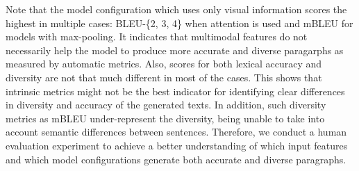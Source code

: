 \documentclass[11pt,a4paper]{article}
\begin{document}
Note that the model configuration which uses only visual information scores the highest in multiple cases: BLEU-\{2, 3, 4\} when attention is used and mBLEU for models with max-pooling.
It indicates that multimodal features do not necessarily help the model to produce more accurate and diverse paragarphs as measured by automatic metrics.
Also, scores for both lexical accuracy and diversity are not that much different in most of the cases.
This shows that intrinsic metrics might not be the best indicator for identifying clear differences in diversity and accuracy of the generated texts.
In addition, such diversity metrics as mBLEU under-represent the diversity, being unable to take into account semantic differences between sentences.
Therefore, we conduct a human evaluation experiment to achieve a better understanding of which input features and which model configurations generate both accurate and diverse paragraphs.



\end{document}
